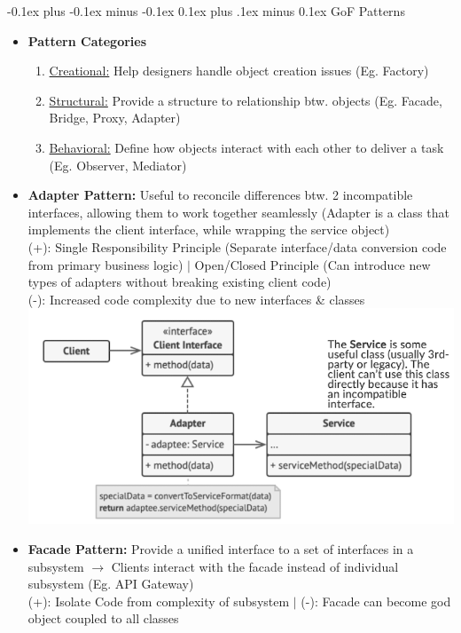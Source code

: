 \documentclass[landscape]{article}
\makeatletter
\renewcommand{\subsection}{\@startsection{subsection}{2}{0mm}%
  {-0.1ex plus -0.1ex minus -0.1ex}%
  {0.1ex plus .1ex minus 0.1ex}%
{\normalfont\scriptsize\bfseries}}
\makeatother
\begin{document}
\begin{multicols*}{5}
    \subsection{GoF Patterns}
    \begin{itemize}
      \item \textbf{Pattern Categories}
      \begin{enumerate}
        \item \underline{Creational:} Help designers handle object creation issues (Eg. Factory)
        \item \underline{Structural:} Provide a structure to relationship btw. objects (Eg. Facade, Bridge, Proxy, Adapter)
        \item \underline{Behavioral:} Define how objects interact with each other to deliver a task (Eg. Observer, Mediator)
      \end{enumerate}
      \item \textbf{Adapter Pattern:} Useful to reconcile differences btw. 2 incompatible interfaces, allowing them to work together seamlessly (Adapter is a class that implements the client interface, while wrapping the service object) \\ 
      (+): Single Responsibility Principle (Separate interface/data conversion code from primary business logic) $|$ Open/Closed Principle (Can introduce new types of adapters without breaking existing client code) \\
      (-): Increased code complexity due to new interfaces \& classes
      \includegraphics[width=0.8\linewidth]{12_adapter_pattern.png}
      \item \textbf{Facade Pattern:} Provide a unified interface to a set of interfaces in a subsystem $\rightarrow$ Clients interact with the facade instead of individual subsystem (Eg. API Gateway) \\
      (+): Isolate Code from complexity of subsystem $|$ (-): Facade can become god object coupled to all classes \\

\end{itemize}
\end{multicols*}
\end{document}
